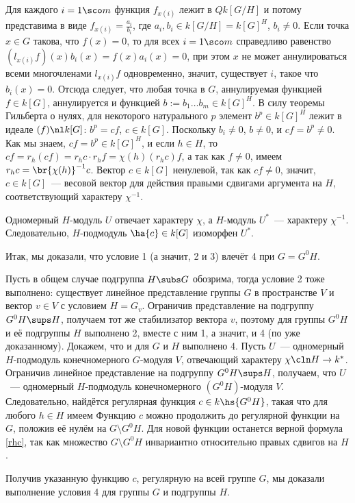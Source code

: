 \documentclass{article}
\newcommand{\sm}{\setminus}
\begin{document}
Для каждого $i=1\sco m$ функция $f_{x(i)}$ лежит в $Qk[G/H]$ и потому представима в виде
$f_{x(i)}=\frac{a_i}{b_i}$, где $a_i,b_i\in k[G/H]=k[G]^H$, $b_i\ne0$. Если точка $x\in G$ такова, что $f(x)=0$,
то для всех $i=1\sco m$ справедливо равенство $(l_{x(i)}f)(x)b_i(x)=f(x)a_i(x)=0$, при этом $x$ не может
аннулироваться всеми многочленами $l_{x(i)}f$ одновременно, значит, существует $i$, такое что $b_i(x)=0$. Отсюда
следует, что любая точка в $G$, аннулируемая функцией $f\in k[G]$, аннулируется и функцией $b:=b_1\dots b_m\in
k[G]^H$. В силу теоремы Гильберта о нулях, для некоторого натурального $p$ элемент $b^p\in k[G]^H$ лежит в идеале
$(f)\nl k[G]$: $b^p=cf$, $c\in k[G]$. Поскольку $b_i\ne0$, $b\ne0$, и $cf=b^p\ne0$. Как мы знаем, $cf=b^p\in
k[G]^H$, и если $h\in H$, то $cf=r_h(cf)=r_hc\cdot r_hf=\chi(h)(r_hc)f$, а так как $f\ne0$, имеем
$r_hc=\br{\chi(h)}^{-1}c$. Вектор $c\in k[G]$ ненулевой, так как $cf\ne0$, значит, $c\in k[G]$~--- весовой вектор
для действия правыми сдвигами аргумента на $H$, соответствующий характеру $\chi^{-1}$.

Одномерный $H$-модуль $U$ отвечает характеру $\chi$, а $H$-модуль $U^*$~--- характеру $\chi^{-1}$. Следовательно,
$H$-подмодуль $\ha{c}\in k[G]$ изоморфен $U^*$.

Итак, мы доказали, что условие 1 (а значит, 2 и 3) влечёт 4 при $G=G^0H$.

Пусть в общем случае подгруппа $H\subs G$ обозрима, тогда условие 2 тоже выполнено: существует линейное
представление группы $G$ в пространстве $V$ и вектор $v\in V$ с условием $H=G_v$. Ограничив представление на
подгруппу $G^0H\sups H$, получаем тот же стабилизатор вектора $v$, поэтому для группы $G^0H$ и её подгруппы $H$
выполнено 2, вместе с ним 1, а значит, и 4 (по уже доказанному). Докажем, что и для $G$ и $H$ выполнено 4. Пусть
$U$~--- одномерный $H$-подмодуль конечномерного $G$-модуля $V$, отвечающий характеру $\chi\cln H\to k^*$.
Ограничив линейное представление на подгруппу $G^0H\sups H$, получаем, что $U$~--- одномерный $H$-подмодуль
конечномерного $(G^0H)$-модуля $V$. Следовательно, найдётся регулярная функция $c\in k\hs{G^0H}$, такая что для
любого $h\in H$ имеем  Функцию $c$ можно продолжить до регулярной
функции на $G$, положив её нулём на $G\sm G^0H$. Для новой функции останется верной формула \eqref{rhc}, так как
множество $G\sm G^0H$ инвариантно относительно правых сдвигов на $H$.

Получив указанную функцию $c$, регулярную на всей группе $G$, мы доказали выполнение условия 4 для группы $G$ и
подгруппы $H$.
\end{document}
